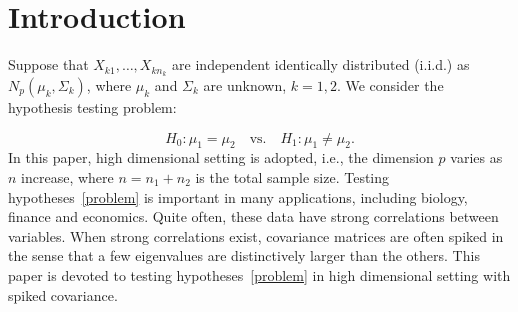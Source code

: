 
\section{Introduction}

Suppose that $X_{k1},\ldots,X_{kn_k}$  are independent identically distributed (i.i.d.) as $N_p(\mu_k,\Sigma_k)$, where $\mu_k$ and $\Sigma_k$ are unknown, $k=1,2$. We consider the hypothesis testing problem:

\begin{equation}\label{problem}
    H_0:\mu_1=\mu_2\quad \textrm{vs.}\quad H_1:\mu_1\neq \mu_2.
\end{equation}
 In this paper, high dimensional setting is adopted, i.e., the dimension $p$ varies as $n$ increase, where $n=n_1+n_2$ is the total sample size.
Testing hypotheses~\eqref{problem} is important in many applications, including biology, finance and economics.
Quite often,  these data have strong correlations between variables.
When strong correlations exist, covariance matrices are often spiked in the sense that a few eigenvalues are distinctively larger than the others.
This paper is devoted to
testing hypotheses~\eqref{problem} in high dimensional setting with spiked covariance.


